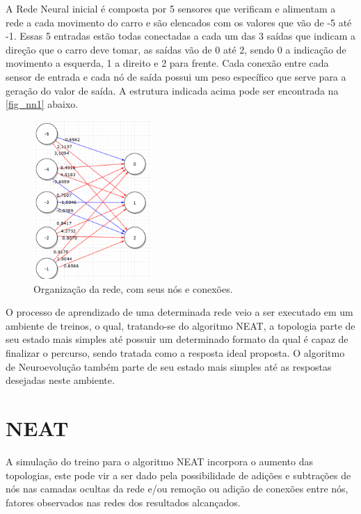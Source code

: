 A Rede Neural inicial é composta por 5 sensores que verificam e alimentam a
rede a cada movimento do carro e são elencados com os valores que vão de -5 até
-1. Essas 5 entradas estão todas conectadas a cada um das 3 saídas que indicam
a direção que o carro deve tomar, as saídas vão de 0 até 2, sendo 0 a indicação
de movimento a esquerda, 1 a direito e 2 para frente. Cada conexão entre cada
sensor de entrada e cada nó de saída possui um peso específico que serve para a
geração do valor de saída. A estrutura indicada acima pode ser encontrada na
\autoref{fig_nn1} abaixo.

\begin{figure}[htb]
        \centering
        \caption{\label{fig_nn1}Organização da rede, com seus nós e conexões.}
        \includegraphics[width=0.4\textwidth]{images/nn1.png}
\end{figure}

O processo de aprendizado de uma determinada rede veio a ser executado em um
ambiente de treinos, o qual, tratando-se do algoritmo NEAT, a topologia parte
de seu estado mais simples até possuir um determinado formato da qual é capaz
de finalizar o percurso, sendo tratada como a resposta ideal proposta. O
algoritmo de Neuroevolução também parte de seu estado mais simples até as
respostas desejadas neste ambiente.

\section{NEAT}

A simulação do treino para o algoritmo NEAT incorpora o aumento das topologias,
este pode vir a ser dado pela possibilidade de adições e subtrações de nós nas
camadas ocultas da rede e/ou remoção ou adição de conexões entre nós, fatores
observados nas redes dos resultados alcançados.

